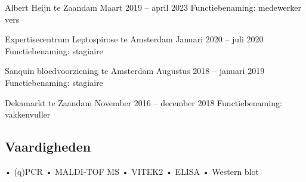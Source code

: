 \documentclass[
]{book}
\begin{document}
Albert Heijn te Zaandam
Maart 2019 -- april 2023
Functiebenaming: medewerker vers

Expertisecentrum Leptospirose te Amsterdam
Januari 2020 -- juli 2020
Functiebenaming: stagiaire

Sanquin bloedvoorziening te Amsterdam
Augustus 2018 -- januari 2019
Functiebenaming: stagiaire

Dekamarkt te Zaandam
November 2016 -- december 2018
Functiebenaming: vakkenvuller

\hypertarget{vaardigheden}{%
\subsection{Vaardigheden}\label{vaardigheden}}

• (q)PCR
• MALDI-TOF MS
• VITEK2
• ELISA
• Western blot

  
\end{document}
